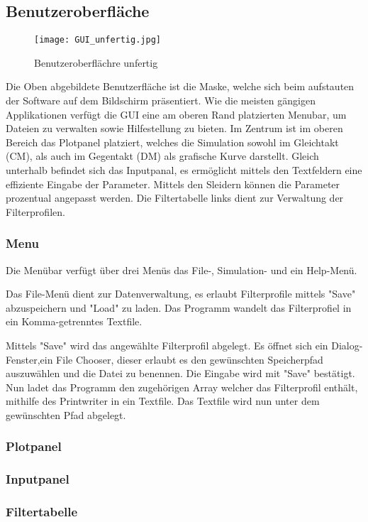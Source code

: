 \subsection{Benutzeroberfläche} \label{subsec:benutzeroberflaeche}

\begin{figure}[H]
		\centering
		\texttt{[image: GUI\_unfertig.jpg]}
		\label{fig:gui}
		\caption{Benutzeroberflächre unfertig}
\end{figure}

Die Oben abgebildete Benutzerfläche ist die Maske, welche sich beim aufstauten der Software auf dem Bildschirm präsentiert.
Wie die  meisten gängigen Applikationen verfügt die GUI eine am oberen Rand platzierten Menubar, um Dateien zu verwalten sowie Hilfestellung zu bieten.
Im Zentrum ist im oberen Bereich das Plotpanel platziert, welches die Simulation sowohl im Gleichtakt (CM), als auch im Gegentakt (DM) als grafische Kurve darstellt.
Gleich unterhalb befindet sich das Inputpanal, es ermöglicht mittels den Textfeldern eine  effiziente Eingabe der  Parameter. Mittels den Sleidern können die Parameter prozentual angepasst werden.
Die Filtertabelle links dient zur Verwaltung der Filterprofilen.


\subsubsection{Menu}\label{subsubsec:menu}

Die Menübar verfügt über drei Menüs das File-,  Simulation- und ein Help-Menü.

Das File-Menü dient zur Datenverwaltung, es erlaubt Filterprofile mittels "Save" abzuspeichern und "Load" zu laden. 
Das Programm wandelt das Filterprofiel in ein Komma-getrenntes Textfile.

Mittels "Save" wird das angewählte Filterprofil abgelegt. Es öffnet sich ein Dialog-Fenster,ein File Chooser, dieser erlaubt es den gewünschten Speicherpfad auszuwählen und die Datei zu benennen. Die Eingabe wird mit "Save" bestätigt. Nun ladet das Programm den zugehörigen Array welcher das Filterprofil enthält, mithilfe des Printwriter in ein Textfile. Das Textfile wird nun unter dem gewünschten Pfad abgelegt. 





\subsubsection{Plotpanel} \label{subsubsec:plotpanel}


\subsubsection{Inputpanel} \label{subsubsec:inputpanel}



\subsubsection{Filtertabelle} \label{subsubsec:filtertabelle}

